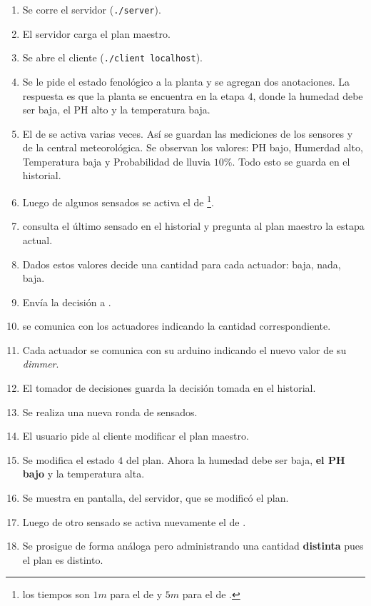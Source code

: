       \begin{enumerate}
        \item Se corre el servidor (\texttt{./server}).
        \item El servidor carga el plan maestro.
        \item Se abre el cliente (\texttt{./client localhost}).
        \item Se le pide el estado fenol\'ogico a la planta y se
            agregan dos anotaciones.
            La respuesta es que la planta se encuentra en la etapa $4$, donde
            la humedad debe ser baja, el PH alto y la temperatura baja.
        \item El \timer{} de \condiciones{} se activa varias veces. As\'i se guardan las
            mediciones de los sensores y de la central meteorol\'ogica.
            Se observan los valores: PH bajo, Humerdad alto, Temperatura baja y
            Probabilidad de lluvia $10\%$.
            Todo esto se guarda en el historial.
        \item Luego de algunos sensados se activa el \timer{} de \decisiones{}\footnote{
            los tiempos son $1m$ para el de \condiciones{} y $5m$ para el de \decisiones{}.}.
        \item \decisiones{} consulta el \'ultimo sensado en el historial y pregunta al plan
            maestro la estapa actual.
        \item Dados estos valores decide una cantidad para cada actuador: baja, nada, baja.
        \item Env\'ia la decisi\'on a \manejadorAct{}.
        \item \manejadorAct{} se comunica con los actuadores indicando la cantidad
            correspondiente.
        \item Cada actuador se comunica con su arduino indicando el nuevo valor de su
            \textit{dimmer}.
        \item El tomador de decisiones guarda la decisi\'on tomada en el historial.
        \item Se realiza una nueva ronda de sensados.
        \item El usuario pide al cliente modificar el plan maestro.
        \item Se modifica el estado $4$ del plan. Ahora la humedad debe ser baja,
            \textbf{el PH bajo} y la temperatura alta.
        \item Se muestra en pantalla, del servidor, que se modific\'o el plan.
        \item Luego de otro sensado se activa nuevamente el \timer{} de \decisiones{}.
        \item Se prosigue de forma an\'aloga pero administrando una cantidad
            \textbf{distinta} pues el plan es distinto.
      \end{enumerate}

